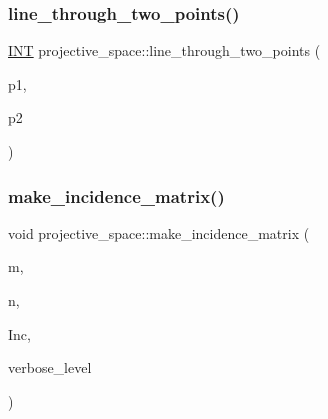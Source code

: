 \mbox{\label{classprojective__space_abbf3151422696b42f4c4b0b4090495d6}} 
\subsubsection{\texorpdfstring{line\+\_\+through\+\_\+two\+\_\+points()}{line\_through\_two\_points()}}
{\footnotesize\ttfamily \mbox{\hyperlink{galois_8h_a09fddde158a3a20bd2dcadb609de11dc}{I\+NT}} projective\+\_\+space\+::line\+\_\+through\+\_\+two\+\_\+points (\begin{DoxyParamCaption}\item[{\mbox{\hyperlink{galois_8h_a09fddde158a3a20bd2dcadb609de11dc}{I\+NT}}}]{p1,  }\item[{\mbox{\hyperlink{galois_8h_a09fddde158a3a20bd2dcadb609de11dc}{I\+NT}}}]{p2 }\end{DoxyParamCaption})}

\mbox{\label{classprojective__space_a9694e996af68a7d3640d1c56ce591db2}} 
\subsubsection{\texorpdfstring{make\+\_\+incidence\+\_\+matrix()}{make\_incidence\_matrix()}}
{\footnotesize\ttfamily void projective\+\_\+space\+::make\+\_\+incidence\+\_\+matrix (\begin{DoxyParamCaption}\item[{\mbox{\hyperlink{galois_8h_a09fddde158a3a20bd2dcadb609de11dc}{I\+NT}} \&}]{m,  }\item[{\mbox{\hyperlink{galois_8h_a09fddde158a3a20bd2dcadb609de11dc}{I\+NT}} \&}]{n,  }\item[{\mbox{\hyperlink{galois_8h_a09fddde158a3a20bd2dcadb609de11dc}{I\+NT}} $\ast$\&}]{Inc,  }\item[{\mbox{\hyperlink{galois_8h_a09fddde158a3a20bd2dcadb609de11dc}{I\+NT}}}]{verbose\+\_\+level }\end{DoxyParamCaption})}

